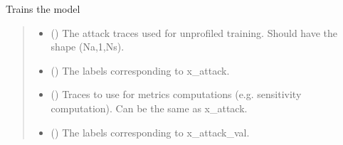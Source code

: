 \documentclass[letterpaper,10pt,english]{sphinxmanual}
\begin{document}
\begin{fulllineitems}

\begin{fulllineitems}
\label{\detokenize{MLSCAlib.Attacks:MLSCAlib.Attacks.unprofiled.UnProfiled.train_model_default}}
\pysigstartsignatures
{}
\pysigstopsignatures
\sphinxAtStartPar
Trains the model
\begin{quote}\begin{description}
\begin{itemize}
\item {} 
\sphinxAtStartPar
{} () \textendash{} The attack traces used for unprofiled training. Should have the shape (Na,1,Ns).

\item {} 
\sphinxAtStartPar
{} (\sphinxstyleliteralemphasis{\sphinxupquote{{[}}}\sphinxstyleliteralemphasis{\sphinxupquote{{]}}}) \textendash{} The labels corresponding to x\_attack.

\item {} 
\sphinxAtStartPar
{} () \textendash{} Traces to use for metrics computations (e.g. sensitivity computation). Can be
the same as x\_attack.

\item {} 
\sphinxAtStartPar
{} (\sphinxstyleliteralemphasis{\sphinxupquote{{[}}}\sphinxstyleliteralemphasis{\sphinxupquote{{]}}}) \textendash{} The labels corresponding to x\_attack\_val.


\end{itemize}
\end{description}
\end{quote}
\end{fulllineitems}
\end{fulllineitems}
\end{document}
